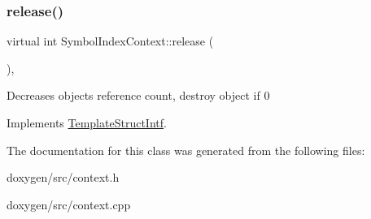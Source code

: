 \mbox{\label{class_symbol_index_context_a262d9c0254f388b048ecb240f8f00199}} 
\subsubsection{\texorpdfstring{release()}{release()}}
{\footnotesize\ttfamily virtual int Symbol\+Index\+Context\+::release (\begin{DoxyParamCaption}{ }\end{DoxyParamCaption})\hspace{0.3cm}{\ttfamily [inline]}, {\ttfamily [virtual]}}

Decreases object\textquotesingle{}s reference count, destroy object if 0 

Implements \mbox{\hyperlink{class_template_struct_intf_a3dce7dd29d3f66a8080b40578e8a5045}{Template\+Struct\+Intf}}.



The documentation for this class was generated from the following files\+:\begin{DoxyCompactItemize}
\item 
doxygen/src/context.\+h\item 
doxygen/src/context.\+cpp\end{DoxyCompactItemize}

